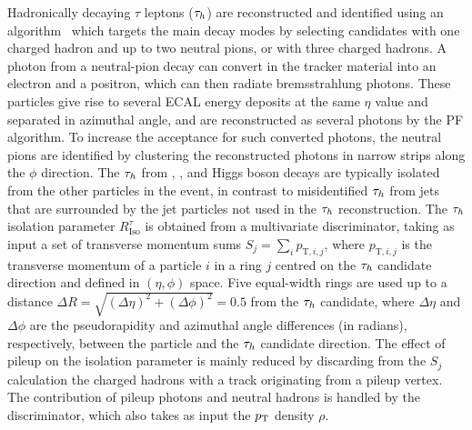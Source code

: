 \documentclass[12pt,twoside,a4paper,cmspaper,final,collab]{cms-tdr}
\begin{document}
Hadronically decaying $\tau$ leptons ($\tau_h$) are reconstructed and identified using an algorithm~\cite{CMS-PAS-TAU-11-001}
which targets the main decay modes by selecting candidates with one charged hadron and up to two neutral pions,
or with three charged hadrons.
A photon from a neutral-pion decay can convert in the tracker material into an electron and a positron, which can then radiate
bremsstrahlung photons. These particles give rise to several ECAL energy deposits at the same $\eta$ value and separated in azimuthal angle,
and are reconstructed as several photons by the PF algorithm. To increase the acceptance for such converted photons,
the neutral pions are identified by clustering the reconstructed photons in narrow strips along the $\phi$ direction.
The $\tau_h$ from \PW, \cPZ, and Higgs boson decays are typically isolated from the other particles in the event, in contrast to misidentified $\tau_h$ from
jets that are surrounded by the jet particles not used in the $\tau_h$ reconstruction.
The $\tau_h$ isolation parameter $R_\text{Iso}^{\tau}$ is obtained from a multivariate discriminator,
 taking as input a set of transverse momentum sums $S_{j} = \sum_i p_{\mathrm{T}, i, j}$, where $p_{\mathrm{T}, i, j}$
 is the transverse momentum of a particle $i$ in a ring $j$ centred on the $\tau_h$ candidate direction
and defined in $(\eta, \phi)$ space.
Five equal-width rings are used up to a distance $\Delta R = \sqrt{(\Delta \eta)^2 + (\Delta \phi)^2}=0.5$ from the $\tau_h$ candidate, where
$\Delta \eta$ and $\Delta \phi$ are the pseudorapidity and azimuthal angle differences (in radians), respectively, between the particle
and the $\tau_h$ candidate direction.
The effect of pileup on the isolation parameter is mainly reduced by discarding from the $S_{j}$
calculation the charged hadrons with a track originating from a pileup vertex.
The contribution of pileup photons and neutral hadrons is handled by the discriminator,
which also takes as input the $p_{\mathrm{T}}$ density $\rho$.
\end{document}
